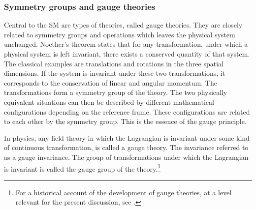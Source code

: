 \subsubsection{Symmetry groups and gauge theories}
Central to the SM are types of theories, called gauge theories. They are closely related to symmetry groups and operations which leaves the physical system unchanged. Noether's theorem \cite{noether1971ivp} states that for any transformation, under which a physical system is left invariant, there exists a conserved quantity of that system. The classical examples are translations and rotations in the three spatial dimensions. If the system is invariant under these two transformations, it corresponds to the conservation of linear and angular momentum. The transformations form a symmetry group of the theory. The two physically equivalent situations can then be described by different mathematical configurations depending on the reference frame. These configurations are related to each other by the symmetry group. This is the essence of the gauge principle.

In physics, any field theory in which the Lagrangian is invariant under some kind of continuous transformation, is called a gauge theory. The invariance referred to as a gauge invariance. The group of transformations under which the Lagrangian is invariant is called the gauge group of the theory.\footnote{For a historical account of the development of gauge theories, at a level relevant for the present discussion, see \cite{gross1992gtp}.}

